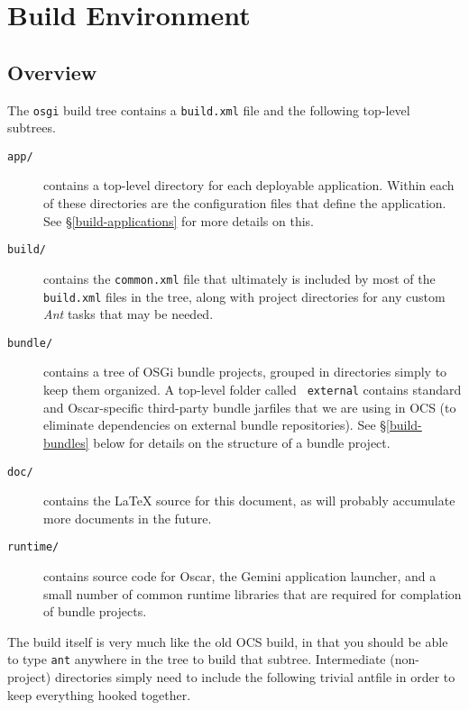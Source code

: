 \documentclass{report}
\begin{document}
\chapter{Build Environment}
\section{Overview}

The {\tt osgi} build tree contains a {\tt build.xml} file and the following 
top-level subtrees.
\begin{description}
	
	\item[\tt app/] contains a top-level directory for each deployable application. 
	Within each of these directories are the configuration files that define the 
	application. See \S\ref{build-applications} for more details on this.
		
	\item[\tt build/] contains the {\tt common.xml} file that ultimately is 
	included by most of the {\tt build.xml} files in the tree, along with project 
	directories for any custom {\it Ant}\/ tasks that may be needed.
		
	\item[\tt bundle/] contains a tree of OSGi bundle projects, grouped in 
	directories simply to keep them organized. A top-level folder called {\tt 
	external} contains standard and Oscar-specific third-party bundle jarfiles that 
	we are using in OCS (to eliminate dependencies on external bundle 
	repositories). See \S\ref{build-bundles} below for details on the structure of 
	a bundle project.
		
	\item[\tt doc/] contains the \LaTeX{} source for this document, as will 
	probably accumulate more documents in the future.
		
	\item[\tt runtime/] contains source code for Oscar, the Gemini application 
	launcher, and a small number of common runtime libraries that are required for 
	complation of bundle projects.

\end{description}

The build itself is very much like the old OCS build, in that you should be 
able to type {\tt ant} anywhere in the tree to build that subtree. Intermediate 
(non-project) directories simply need to include the following trivial antfile 
in order to keep everything hooked together.
\end{document}
